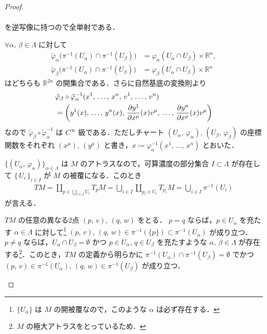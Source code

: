 \documentclass[TQFT_main]{subfiles}
\begin{document}
\begin{proof}
\begin{description}
\begin{align}
        \end{align}
        を逆写像に持つので全単射である．
        \item[\textbf{(DS-2, 3)}] $\forall \alpha,\, \beta \in \Lambda$ に対して
        \begin{align}
            \tilde{\varphi}_\alpha \bigl( \pi^{-1}(U_\alpha) \cap \pi^{-1}(U_\beta) \bigr) &= \varphi_\alpha (U_\alpha \cap U_\beta) \times \mathbb{R}^n, \\
            \tilde{\varphi}_\beta \bigl( \pi^{-1}(U_\alpha) \cap \pi^{-1}(U_\beta) \bigr) &= \varphi_\beta (U_\alpha \cap U_\beta) \times \mathbb{R}^n
        \end{align}
        はどちらも $\mathbb{R}^{2n}$ の開集合である．さらに自然基底の変換則より
        \begin{align}
            &\tilde{\varphi}_\beta \circ \tilde{\varphi}_\alpha^{-1} (x^1,\, \dots,\, x^n,\, v^1,\, \dots,\, v^n) \\
            &= \left( y^1(x),\, \dots,\, y^n (x),\, \pdv{y^1}{x^\mu}()(x) v^\mu,\, \dots,\, \pdv{y^n}{x^\mu}()(x) v^\mu \right) 
        \end{align}
        なので $\tilde{\varphi}_\beta \circ \tilde{\varphi}_\alpha^{-1} $ は $C^\infty$ 級である．ただしチャート $(U_\alpha,\, \varphi_\alpha),\, (U_\beta,\,\varphi_\beta)$ の座標関数をそれぞれ $(x^\mu),\, (y^\mu)$ と書き，$x \coloneqq\varphi_\alpha^{-1}(x^1,\, \dots,\, x^n)$ とおいた．
        \item[\textbf{(DS-4)}] $\{(U_\alpha,\, \varphi_\alpha)\}_{\alpha \in \Lambda}$ は $M$ のアトラスなので，可算濃度の部分集合 $I \subset \Lambda$ が存在して $\{\, U_i\,\}_{i \in I}$ が $M$ の被覆になる．このとき
        \begin{align}
            TM = \coprod_{p \in \bigcup_{i \in I} U_i} T_p M = \bigcup_{i \in I} \coprod_{p_i \in U_i} T_{p_i} M = \bigcup_{i \in I} \pi^{-1} (U_i)
        \end{align}
        が言える．
        \item[\textbf{(DS-5)}] $TM$ の任意の異なる2点 $(p,\, v),\, (q,\, w)$ をとる．
        $p = q$ ならば，$p \in U_\alpha$ を充たす $\alpha \in \Lambda$ に対して\footnote{$\{U_\alpha\}$ は $M$ の開被覆なので，このような $\alpha$ は必ず存在する．} $(p,\, v),\, (q,\,w) \in \pi^{-1} (\{p\}) \subset \pi^{-1}(U_\alpha)$ が成り立つ．
        $p \neq q$ ならば，$U_\alpha \cap U_\beta =\emptyset$ かつ $p \in U_\alpha,\, q \in U_\beta$ を充たすような $\alpha,\, \beta \in \Lambda$ が存在する\footnote{$M$ の極大アトラスをとっているため．}．このとき，$TM$ の定義から明らかに $\pi^{-1} (U_\alpha) \cap \pi^{-1}(U_\beta) = \emptyset$ でかつ $(p,\, v) \in \pi^{-1}(U_\alpha),\, (q,\, w) \in \pi^{-1}(U_\beta)$ が成り立つ．
    \end{description}
    

\end{proof}
\end{document}
